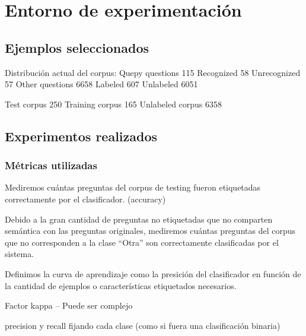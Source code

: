 \section{Entorno de experimentación}

\subsection{Ejemplos seleccionados}

Distribución actual del corpus:
Quepy questions 115
	Recognized 58
	Unrecognized 57
Other questions 6658
	Labeled 607
	Unlabeled 6051

Test corpus 250
Training corpus 165
Unlabeled corpus 6358

\subsection{Experimentos realizados}


\subsubsection{Métricas utilizadas}
\begin{description}
    \item[Precisión] Mediremos cuántas preguntas del corpus de testing fueron etiquetadas correctamente por el clasificador. (accuracy)
    \item[Precisión en preguntas reconocidas] Debido a la gran cantidad de preguntas no etiquetadas que no comparten semántica con las preguntas originales, mediremos cuántas preguntas del corpus que no corresponden a la clase ``Otra'' son correctamente clasificadas por el sistema.
    \item[Curva de aprendizaje] Definimos la curva de aprendizaje como la presición del clasificador en función de la cantidad de ejemplos o características etiquetados necesarios.
    \item Factor kappa  -- Puede ser complejo
    \item precision y recall fijando cada clase (como si fuera una clasificación binaria)
\end{description}


